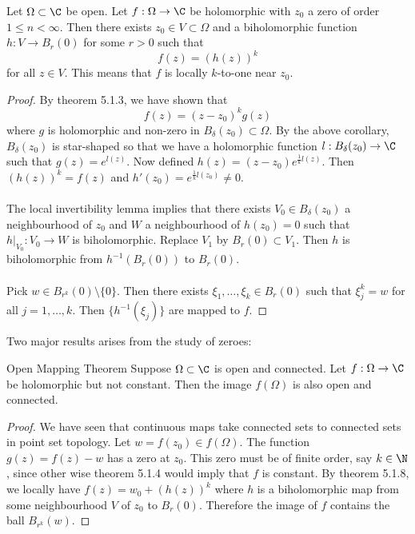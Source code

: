 \documentclass[a4paper]{article}
\begin{document}
\begin{thm}{}{} Let $\Omega\subset\C$ be open. Let $f:\Omega\to\C$ be holomorphic with $z_0$ a zero of order $1\leq n<\infty$. Then there exists $z_0\in V\subset\Omega$ and a biholomorphic function $h:V\to B_r(0)$ for some $r>0$ such that $$f(z)=\left(h(z)\right)^k$$ for all $z\in V$. This means that $f$ is locally $k$-to-one near $z_0$. \tcbline
\begin{proof}
By theorem 5.1.3, we have shown that $$f(z)=(z-z_0)^kg(z)$$ where $g$ is holomorphic and non-zero in $B_\delta(z_0)\subset\Omega$. By the above corollary, $B_\delta(z_0)$ is star-shaped so that we have a holomorphic function $l:B_\delta(z_0)\to\C$ such that $g(z)=e^{l(z)}$. Now defined $h(z)=(z-z_0)e^{\frac{1}{k}l(z)}$. Then $\left(h(z)\right)^k=f(z)$ and $h'(z_0)=e^{\frac{1}{k}l(z_0)}\neq 0$. \\~\\

The local invertibility lemma implies that there exists $V_0\in B_\delta(z_0)$ a neighbourhood of $z_0$ and $W$ a neighbourhood of $h(z_0)=0$ such that $h|_{V_0}:V_0\to W$ is biholomorphic. Replace $V_1$ by $B_r(0)\subset V_1$. Then $h$ is biholomorphic from $h^{-1}(B_r(0))$ to $B_r(0)$. \\~\\

Pick $w\in B_{r^k}(0)\setminus\{0\}$. Then there exists $\xi_1,\dots,\xi_k\in B_r(0)$ such that $\xi_j^k=w$ for all $j=1,\dots,k$. Then $\{h^{-1}(\xi_j)\}$ are mapped to $f$. 
\end{proof}
\end{thm}

Two major results arises from the study of zeroes: 

\begin{thm}{Open Mapping Theorem}{} Suppose $\Omega\subset\C$ is open and connected. Let $f:\Omega\to\C$ be holomorphic but not constant. Then the image $f(\Omega)$ is also open and connected. \tcbline
\begin{proof}
We have seen that continuous maps take connected sets to connected sets in point set topology. Let $w=f(z_0)\in f(\Omega)$. The function $g(z)=f(z)-w$ has a zero at $z_0$. This zero must be of finite order, say $k\in\N$, since other wise theorem 5.1.4 would imply that $f$ is constant. By theorem 5.1.8, we locally have $f(z)=w_0+(h(z))^k$ where $h$ is a biholomorphic map from some neighbourhood $V$ of $z_0$ to $B_r(0)$. Therefore the image of $f$ contains the ball $B_{r^k}(w)$. 
\end{proof}
\end{thm}
\end{document}
